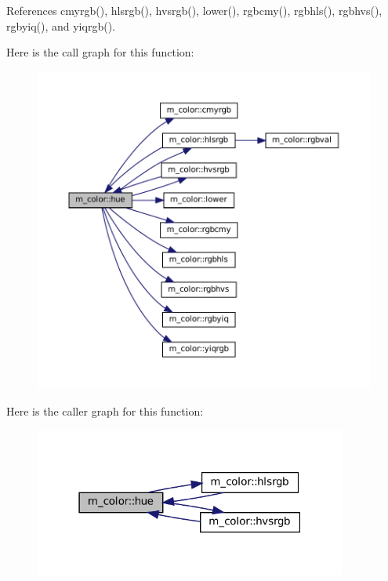 References cmyrgb(), hlsrgb(), hvsrgb(), lower(), rgbcmy(), rgbhls(), rgbhvs(), rgbyiq(), and yiqrgb().

Here is the call graph for this function\+:
\nopagebreak
\begin{figure}[H]
\begin{center}
\leavevmode
\includegraphics[width=350pt]{namespacem__color_a56dd07bbf1378ccc78a230d171f9d429_cgraph}
\end{center}
\end{figure}
Here is the caller graph for this function\+:
\nopagebreak
\begin{figure}[H]
\begin{center}
\leavevmode
\includegraphics[width=291pt]{namespacem__color_a56dd07bbf1378ccc78a230d171f9d429_icgraph}
\end{center}
\end{figure}
\mbox{\label{namespacem__color_a334ec90d94bbfb9a4c08c5f9efdb8c47}} 

